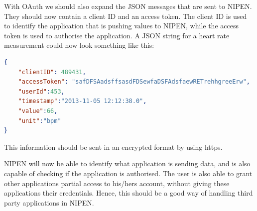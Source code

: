 With OAuth we should also expand the JSON messages that are sent to NIPEN.
They should now contain a client ID and an access token.
The client ID is used to identify the application that is pushing values to NIPEN, while the access token is used to authorise the application.
A JSON string for a heart rate measurement could now look something like this:

\begin{lstlisting}[language=json]
{
	"clientID": 489431,
	"accessToken": "safDFSAadsffsasdFDSewfaDSFAdsfaewRETrehhgreeErw",
	"userId":453,
	"timestamp":"2013-11-05 12:12:38.0",
	"value":66,
	"unit":"bpm"
}
\end{lstlisting}

This information should be sent in an encrypted format by using https.

NIPEN will now be able to identify what application is sending data, and is also capable of checking if the application is authorised.
The user is also able to grant other applications partial access to his/hers account, without giving these applications their credentials.
Hence, this should be a good way of handling third party applications in NIPEN.

